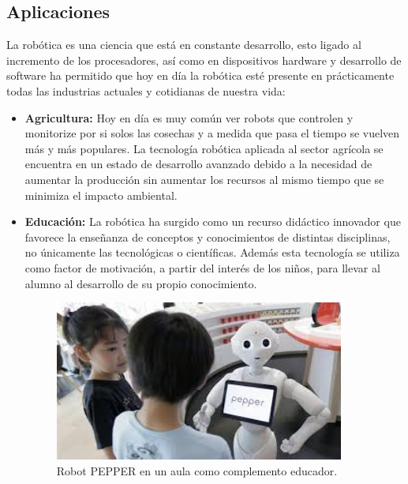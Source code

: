 \subsection{Aplicaciones}
\hspace{1cm} La robótica es una ciencia que está en constante desarrollo, esto ligado al incremento de los procesadores, así como en dispositivos hardware y desarrollo de software ha permitido que hoy en día la robótica esté presente en prácticamente todas las industrias actuales y cotidianas de nuestra vida:
\begin{itemize}
		\item \textbf{Agricultura: }Hoy en día es muy común ver robots que controlen y monitorize por si solos las cosechas y a medida que pasa el tiempo se vuelven más y más populares. La tecnología robótica aplicada al sector agrícola se encuentra en un estado de desarrollo avanzado debido a la necesidad de aumentar la producción sin aumentar los recursos al mismo tiempo que se minimiza el impacto ambiental.
		\item \textbf{Educación: }La robótica ha surgido como un recurso didáctico innovador que favorece la enseñanza de conceptos y conocimientos de distintas disciplinas, no únicamente las tecnológicas o científicas.  Además esta tecnología  se utiliza como factor de motivación, a partir del interés de los niños, para llevar al alumno al desarrollo de su propio conocimiento.
		
		\begin{figure}[H]
			\begin{center}
				\includegraphics[width=0.9\textwidth]{imag/IMG12.jpeg}
					\caption{Robot PEPPER en un aula como complemento educador.}
			\label{fig:Robot PEPPER.}	
			\end{center}
		\end{figure}


\end{itemize}
